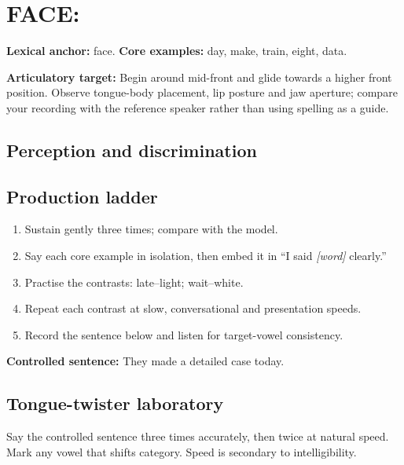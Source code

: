 \section{FACE: }
\label{sec:vowel-12}
\textbf{Lexical anchor:} face. \textbf{Core examples:} day, make, train, eight, data.\par
\textbf{Articulatory target:} Begin around mid-front and glide towards a higher front position. Observe tongue-body placement, lip posture and jaw aperture; compare your recording with the reference speaker rather than using spelling as a guide.
\subsection{Perception and discrimination}
\subsection{Production ladder}
\begin{enumerate}[label=\arabic*.]
\item Sustain  gently three times; compare with the model.
\item Say each core example in isolation, then embed it in ``I said \emph{[word]} clearly.''
\item Practise the contrasts: late--light; wait--white.
\item Repeat each contrast at slow, conversational and presentation speeds.
\item Record the sentence below and listen for target-vowel consistency.
\end{enumerate}
\textbf{Controlled sentence:} They made a detailed case today.
\subsection{Tongue-twister laboratory}
Say the controlled sentence three times accurately, then twice at natural speed. Mark any vowel that shifts category. Speed is secondary to intelligibility.
